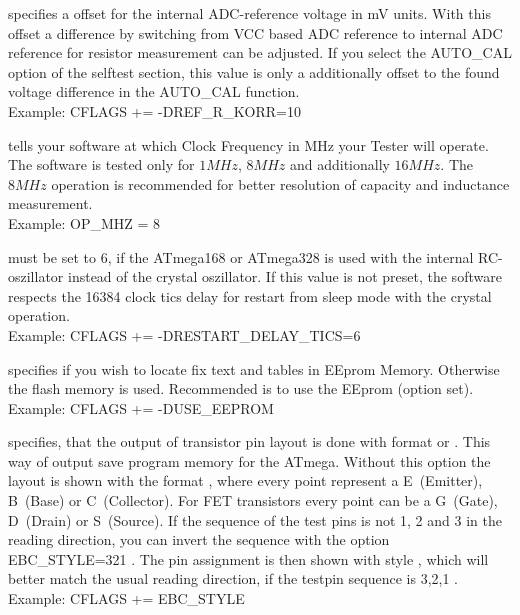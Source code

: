 \begin{description} \setlength{\itemsep}{0em}
  \item[REF\_R\_KORR] specifies a offset for the internal ADC-reference voltage in mV units.
With this offset a difference by switching from VCC based ADC reference to internal ADC reference for resistor measurement can be adjusted.
If you select the AUTO\_CAL option of the selftest section, this value is only a additionally offset to the found voltage 
difference in the AUTO\_CAL function.\\
Example: CFLAGS += -DREF\_R\_KORR=10

  \item[OP\_MHZ] tells your software at which Clock Frequency in MHz your Tester will operate.
The software is tested only for \(1MHz\), \(8MHz\) and additionally \(16MHz\). 
The \(8MHz\) operation is recommended for better resolution of capacity and inductance measurement.\\
Example: OP\_MHZ = 8

  \item[RESTART\_DELAY\_TICS] must be set to 6, if the ATmega168 or ATmega328 is used with the internal RC-oszillator instead of
the crystal oszillator.
If this value is not preset, the software respects the 16384 clock tics delay for restart from sleep mode with the crystal operation.\\
Example: CFLAGS += -DRESTART\_DELAY\_TICS=6

  \item[USE\_EEPROM] specifies if you wish to locate fix text and tables in EEprom Memory. Otherwise the flash memory is used.
Recommended is to use the EEprom (option set).\\
Example: CFLAGS += -DUSE\_EEPROM

\item[EBC\_STYLE] specifies, that the output of transistor pin layout is done with format  or .
This way of output save program memory for the ATmega. Without this option the layout is shown with the
format , where every point represent a E~(Emitter), B~(Base) or C~(Collector).
For FET transistors every point can be a G~(Gate), D~(Drain) or S~(Source).
If the sequence of the test pins is not 1, 2 and 3 in the reading direction, you can invert the sequence with the option
EBC\_STYLE=321 . The pin assignment is then shown with style , which will better match the usual
reading direction, if the testpin sequence is 3,2,1 .\\
Example: CFLAGS += EBC\_STYLE


\end{description}
